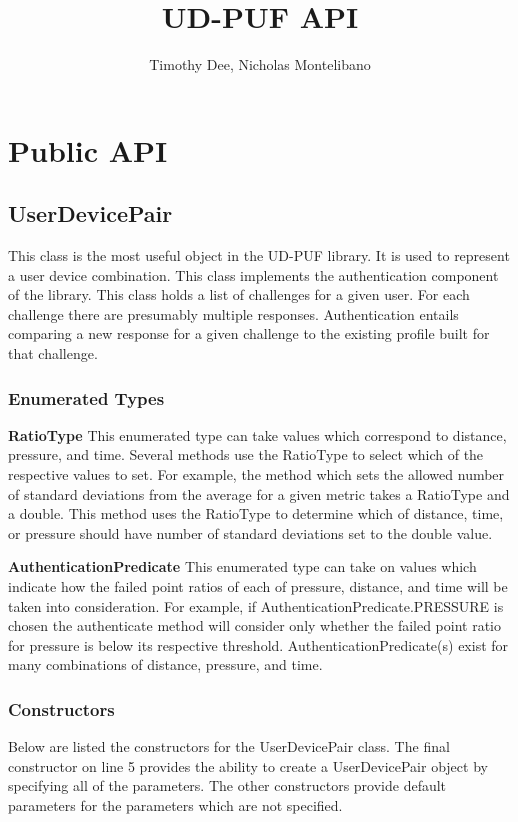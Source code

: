 \documentclass{article} %
\author{Timothy Dee, Nicholas Montelibano}
\title{UD-PUF API}
\begin{document}
\thispagestyle{empty}   %
\maketitle      %

\section{Public API}
\subsection{UserDevicePair}
This class is the most useful object in the UD-PUF library. It is used to represent a user device combination. This class implements the authentication component of the library.
This class holds a list of challenges for a given user. For each challenge there are presumably multiple responses.
Authentication entails comparing a new response for a given challenge to the existing profile built for that challenge.

\subsubsection{Enumerated Types}
\textbf{RatioType}
This enumerated type can take values which correspond to distance, pressure, and time. 
Several methods use the RatioType to select which of the respective values to set.
For example, the method which sets the allowed number of standard deviations from the average for a given metric takes a RatioType and a double.
This method uses the RatioType to determine which of distance, time, or pressure should have number of standard deviations set to the double value.

\noindent
\textbf{AuthenticationPredicate}
This enumerated type can take on values which indicate how the failed point ratios of each of pressure, distance, and time will be taken into consideration.
For example, if AuthenticationPredicate.PRESSURE is chosen the authenticate method will consider only whether the failed point ratio for pressure is below its respective threshold.
AuthenticationPredicate(s) exist for many combinations of distance, pressure, and time.

\subsubsection{Constructors}
Below are listed the constructors for the UserDevicePair class. The final constructor on line 5 provides the ability to create a UserDevicePair object by specifying all of the parameters.
The other constructors provide default parameters for the parameters which are not specified.
\end{document}
